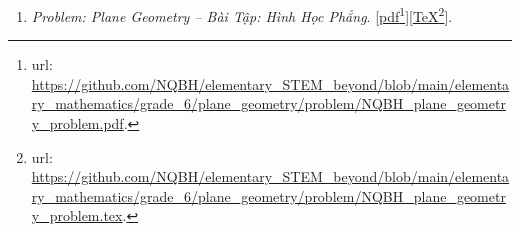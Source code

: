 \documentclass[12pt,twoside]{book}
\newtheorem{baitoan}{Bài toán}
\begin{document}
\begin{enumerate}
	\begin{baitoan}[{\sf Program}: Interchange between fraction \& decimal]
		Viết chương trình {\sf Pascal, Python, C{\tt/}C++} để chuyển đổi giữa số thập phân \& phân số.
	\end{baitoan}
	
	\begin{baitoan}[{\sf Program}: Interchange between ratio \& percentage]
		Viết chương trình {\sf Pascal, Python, C{\tt/}C++} để chuyển đổi giữa tỷ số \& tỷ số $\%$.
	\end{baitoan}
	
	\begin{baitoan}[{\sf Program}: Interchange between base-$d$ systems]
		Viết chương trình {\sf Pascal, Python, C{\tt/}C++} để chuyển đổi giữa 2 hệ cơ số khác nhau.
	\end{baitoan}
	
	\begin{baitoan}[{\sf Program}: Arithmetic sequence]
		Viết chương trình {\sf Pascal, Python, C{\tt/}C++} để in ra cấp số cộng \& tính tổng của cấp số cộng $\{a + bn\}_{n=0}^{+\infty}$ với số hạng đầu $a\in\mathbb{R}$ \& công sai $b\in\mathbb{R}$ nhập từ bàn phím.
	\end{baitoan}
	
	\begin{baitoan}[{\sf Program}: Geometric sequence]
		Viết chương trình {\sf Pascal, Python, C{\tt/}C++} để in ra cấp số nhân \& tính tổng của cấp số nhân $\{aq^n\}_{n=0}^{+\infty}$ với số hạng đầu $a\in\mathbb{R}$ \& công bội $q\in\mathbb{R}$ nhập từ bàn phím.
	\end{baitoan}
	\item {\it Problem: Plane Geometry -- Bài Tập: Hình Học Phẳng}. [\href{https://github.com/NQBH/elementary_STEM_beyond/blob/main/elementary_mathematics/grade_6/plane_geometry/problem/NQBH_plane_geometry_problem.pdf}{pdf}\footnote{{\sc url}: \url{https://github.com/NQBH/elementary_STEM_beyond/blob/main/elementary_mathematics/grade_6/plane_geometry/problem/NQBH_plane_geometry_problem.pdf}.}][\href{https://github.com/NQBH/elementary_STEM_beyond/blob/main/elementary_mathematics/grade_6/plane_geometry/problem/NQBH_plane_geometry_problem.tex}{\TeX}\footnote{{\sc url}: \url{https://github.com/NQBH/elementary_STEM_beyond/blob/main/elementary_mathematics/grade_6/plane_geometry/problem/NQBH_plane_geometry_problem.tex}.}].
	

\end{enumerate}
\end{document}
